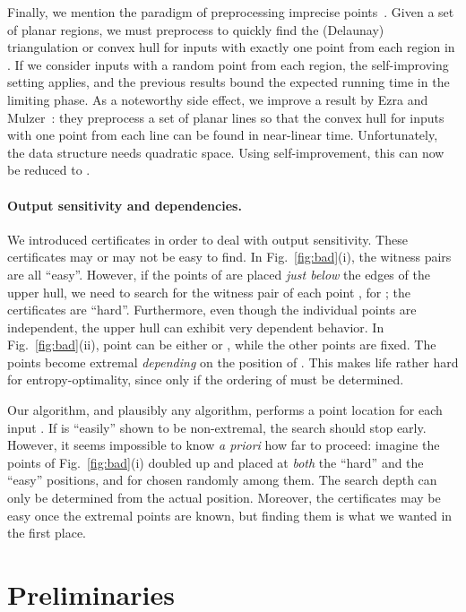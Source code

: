 \documentclass[letterpaper,11pt]{article}
\begin{document}
Finally, we mention the paradigm of 
preprocessing imprecise
points~\cite{BuchinLoMoMu11,EzraMu13,HeldMi08,LoefflerSn10,vKreveldLoMi10}.
Given a set  of 
planar regions, we must 
preprocess  to 
quickly find the (Delaunay) 
triangulation or convex hull 
for inputs with exactly 
one point from each region 
in .  If we consider inputs 
with a random point from each 
region, the self-improving setting applies,
and the previous results 
bound the expected
running time in the limiting phase.
As a noteworthy side effect, we 
improve a result
by Ezra and Mulzer~\cite{EzraMu13}:
they preprocess a set of
planar lines so that
the convex hull for 
inputs with one point from each
line can be found in near-linear
time. Unfortunately, the data structure
needs quadratic space.
Using self-improvement,
this can now be reduced
to .

\paragraph{Output sensitivity and dependencies.}
We introduced certificates in 
order to deal with output 
sensitivity. These certificates
may or may not be easy 
to find. In Fig.~\ref{fig:bad}(i), 
the witness pairs are all 
``easy''. However, if 
the points of  are placed
\emph{just below} the edges 
of the upper hull, we need 
to search for the witness 
pair of each point , 
for ;
the certificates are
``hard''. Furthermore, 
even though the individual 
points are independent, the 
upper hull can exhibit 
very dependent behavior. 
In Fig.~\ref{fig:bad}(ii),
point  can be either 
 or , while 
the other points are fixed. 
The points  
become extremal \emph{depending} 
on the position of . This 
makes life rather hard for 
entropy-optimality, since only 
if  the ordering of 
 must be determined.

Our algorithm, and plausibly 
any algorithm, performs a 
point location for each input .
If  is ``easily'' shown to be 
non-extremal, the search 
should stop early. 
However, it seems
impossible to know \emph{a priori}
how far to proceed: imagine 
the points  of Fig.~\ref{fig:bad}(i) 
doubled up and placed at \emph{both} 
the ``hard'' and the ``easy'' positions, 
and  for  chosen 
randomly among them. The 
search depth can only be 
determined from the actual 
position. Moreover, the certificates may 
be easy once the extremal points are known,
but finding them is what we wanted in the
first place.

\section{Preliminaries}
\label{sec:prelims}
\end{document}
